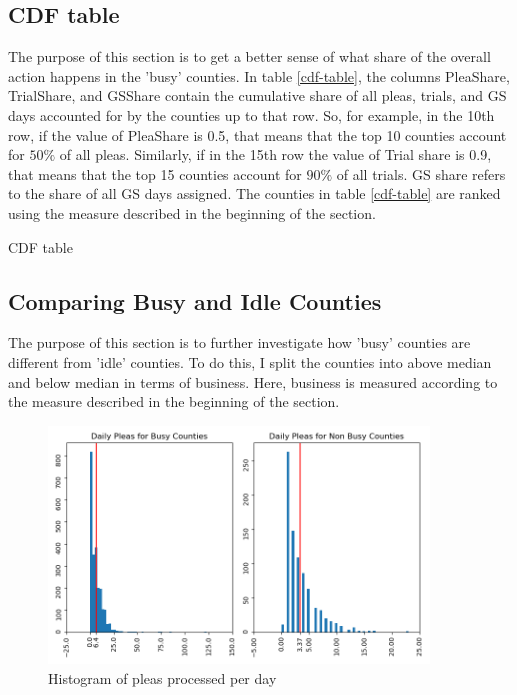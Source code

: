 \documentclass[11pt]{article}
\begin{document}
  \subsection{CDF table}
    The purpose of this section is to get a better sense of what share of the overall action happens
    in the 'busy' counties. In table \ref{cdf-table}, the columns PleaShare, TrialShare, and GSShare
    contain the cumulative share of all pleas, trials, and GS days accounted for by the counties up to that row. So, for example, in the 10th row, if the value of PleaShare is 0.5, that means that the top
    10 counties account for $50\%$ of all pleas. Similarly, if in the 15th row the value of Trial share is 0.9, that means that the top 15 counties account for $90\%$ of all trials. GS share refers to the share of all GS days assigned. The counties in table \ref{cdf-table} are ranked using the measure described in the beginning of the section.

    \begin{table}[H]
      \centering
      \small
      \caption{CDF table}
      \label{cdf-table}
      
    \end{table}

  \subsection{Comparing Busy and Idle Counties}
    The purpose of this section is to further investigate how 'busy' counties are different from 'idle'
    counties. To do this, I split the counties into above median and below median in terms of business.
    Here, business is measured according to the measure described in the beginning of the section.

    \begin{figure}[H]
      \includegraphics[width=0.9\textwidth]{../../../output/figures/Exploration/busy_vs_idle_plea_hists.png}
      \caption{Histogram of pleas processed per day}
      \label{plea-hist}
    \end{figure}
\end{document}
